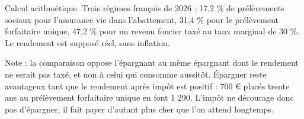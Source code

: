 Calcul arithmétique. Trois régimes français de 2026 : 17,2 \% de prélèvements sociaux pour l'assurance vie dans l'abattement, 31,4 \% pour le prélèvement forfaitaire unique, 47,2 \% pour un revenu foncier taxé au taux marginal de 30 \%. Le rendement est supposé réel, sans inflation.\par Note : la comparaison oppose l'épargnant au même épargnant dont le rendement ne serait pas taxé, et non à celui qui consomme aussitôt. Épargner reste avantageux tant que le rendement après impôt est positif : 700 \euro{} placés trente ans au prélèvement forfaitaire unique en font 1 290. L'impôt ne décourage donc pas d'épargner, il fait payer d'autant plus cher que l'on attend longtemps.
